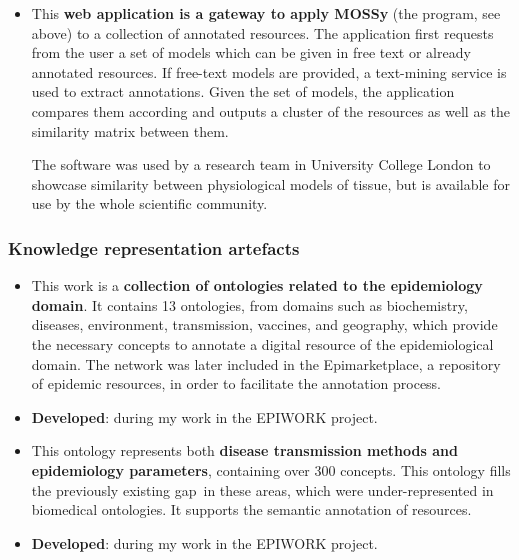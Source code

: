 \begin{itemize}
    \item This \textbf{web application is a gateway to apply MOSSy} (the program, see above) to a collection of annotated resources. The application first requests from the user a set of models which can be given in free text or already annotated resources. If free-text models are provided, a text-mining service is used to extract annotations. Given the set of models, the application compares them according and outputs a cluster of the resources as well as the similarity matrix between them.
    
    The software was used by a research team in University College London to showcase similarity between physiological models of tissue, but is available for use by the whole scientific community.
\end{itemize}


\subsubsection{Knowledge representation artefacts}

\begin{itemize}
    \item This work is a \textbf{collection of ontologies related to the epidemiology domain}. It contains 13 ontologies, from domains such as biochemistry, diseases, environment, transmission, vaccines, and geography, which provide the necessary concepts to annotate a digital resource of the epidemiological domain. The network was later included in the Epimarketplace, a repository of epidemic resources, in order to facilitate the annotation process.
    \item \textbf{Developed}: during my work in the EPIWORK project.
\end{itemize}

\begin{itemize}
    \item This ontology represents both \textbf{disease transmission methods and epidemiology parameters}, containing over 300 concepts. This ontology fills the previously existing gap~in these areas, which were under-represented in biomedical ontologies. It supports the semantic annotation of resources.
    \item \textbf{Developed}: during my work in the EPIWORK project.
\end{itemize}


